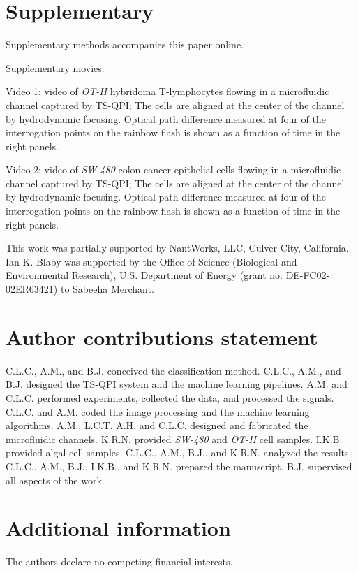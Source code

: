 \documentclass[aps,pra,reprint,superscriptaddress]{revtex4-1}
\begin{document}
\section*{Supplementary}
Supplementary methods accompanies this paper online.

Supplementary movies:

Video 1: video of \textit{OT-II} hybridoma T-lymphocytes flowing in a microfluidic channel captured by TS-QPI; The cells are aligned at the center of the channel by hydrodynamic focusing. Optical path difference measured at four of the interrogation points on the rainbow flash is shown as a function of time in the right panels.

Video 2: video of \textit{SW-480} colon cancer epithelial cells flowing in a microfluidic channel captured by TS-QPI; The cells are aligned at the center of the channel by hydrodynamic focusing. Optical path difference measured at four of the interrogation points on the rainbow flash is shown as a function of time in the right panels.

\begin{acknowledgments}
This work was partially supported by NantWorks, LLC, Culver City, California. Ian K. Blaby was supported by the Office of Science (Biological and Environmental Research), U.S. Department of Energy (grant no. DE-FC02-02ER63421) to Sabeeha Merchant.
\end{acknowledgments}

\section*{Author contributions statement}

C.L.C., A.M., and B.J. conceived the classification method. C.L.C., A.M., and B.J. designed the TS-QPI system and the machine learning pipelines. A.M. and C.L.C. performed experiments, collected the data, and processed the signals. C.L.C. and A.M. coded the image processing and the machine learning algorithms. A.M., L.C.T. A.H. and C.L.C. designed and fabricated the microfluidic channels. K.R.N. provided \textit{SW-480} and \textit{OT-II} cell samples. I.K.B. provided algal cell samples. C.L.C., A.M., B.J., and K.R.N. analyzed the results. C.L.C., A.M., B.J., I.K.B., and K.R.N. prepared the manuscript. B.J. supervised all aspects of the work.

\section*{Additional information}

The authors declare no competing financial interests.
\end{document}
